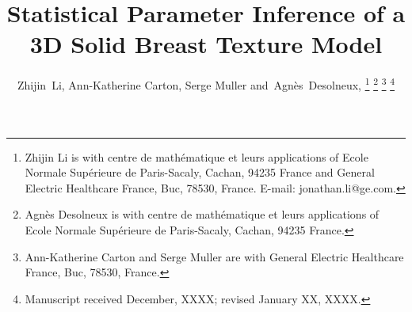 \documentclass[journal]{IEEEtran}
\begin{document}
%
\title{Statistical Parameter Inference of a 3D Solid Breast Texture
  Model} %
%
%
%

\author{Zhijin~Li, Ann-Katherine Carton, Serge Muller
  and~Agnès~Desolneux,%
  \thanks{Zhijin Li is with centre de math\'{e}matique et leurs
    applications of Ecole Normale Sup\'{e}rieure de Paris-Sacaly,
    Cachan, 94235 France and General Electric Healthcare France, Buc,
    78530, France. E-mail:
    jonathan.li@ge.com.}%
  \thanks{Agnès Desolneux is with centre de math\'{e}matique et leurs
    applications of Ecole Normale Sup\'{e}rieure de Paris-Sacaly,
    Cachan, 94235 France.}%
  \thanks{Ann-Katherine Carton and Serge Muller are with General
    Electric Healthcare France, Buc, 78530,
    France.}%
  \thanks{Manuscript received December, XXXX; revised January XX,
    XXXX.}}

%
%
\end{document}
